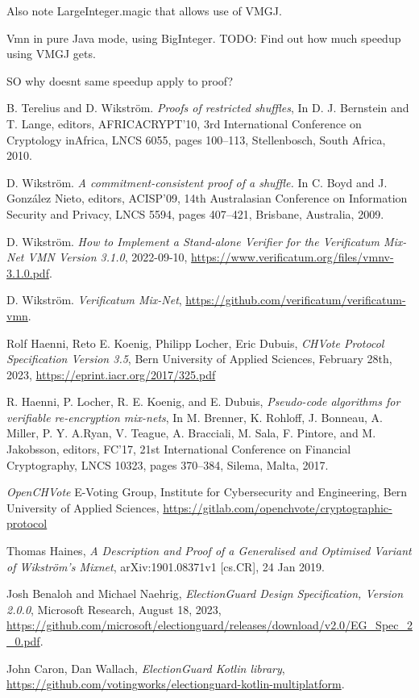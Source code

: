 \documentclass{article}
\begin{document}
Also note LargeInteger.magic that allows use of VMGJ.

Vmn in pure Java mode, using BigInteger. TODO: Find out how much speedup
using VMGJ gets.

SO why doesnt same speedup apply to proof?

\begin{thebibliography}{999}

  B. Terelius and D. Wikström. 
  \emph{Proofs of restricted shuffles},
  In D. J. Bernstein and T. Lange, editors, AFRICACRYPT'10, 
  3rd International Conference on Cryptology inAfrica, LNCS 6055, pages 100--113, 
  Stellenbosch, South Africa, 2010. 

 D. Wikström. 
  \emph{A commitment-consistent proof of a shuffle.} 
  In C. Boyd and J. González Nieto, editors, 
  ACISP'09, 14th Australasian Conference on Information Security and Privacy, LNCS 5594, pages 407--421,
  Brisbane, Australia, 2009. 

 D. Wikström. 
  \emph{How to Implement a Stand-alone Verifier for the Verificatum Mix-Net VMN Version 3.1.0},
  2022-09-10, 
  \url{https://www.verificatum.org/files/vmnv-3.1.0.pdf}.

 D. Wikström. 
  \emph{Verificatum Mix-Net},
  \url{https://github.com/verificatum/verificatum-vmn}.

  Rolf Haenni, Reto E. Koenig, Philipp Locher, Eric Dubuis,
  \emph{CHVote Protocol Specification Version 3.5}, 
  Bern University of Applied Sciences,
  February 28th, 2023, 
  \url{https://eprint.iacr.org/2017/325.pdf} 
  
  R. Haenni, P. Locher, R. E. Koenig, and E. Dubuis,
  \emph{Pseudo-code algorithms for verifiable re-encryption mix-nets},
  In M. Brenner, K. Rohloff, J. Bonneau, A. Miller, P. Y. A.Ryan, V. Teague, A. Bracciali, M. Sala, F. Pintore, and M. Jakobsson, editors, 
  FC'17, 21st International Conference on Financial Cryptography, LNCS 10323, pages 370--384,
  Silema, Malta, 2017. 
  
\emph{OpenCHVote}
  E-Voting Group, Institute for Cybersecurity and Engineering, 
  Bern University of Applied Sciences, 
  \url{https://gitlab.com/openchvote/cryptographic-protocol} 

  Thomas Haines, 
  \emph{A Description and Proof of a Generalised and Optimised Variant of Wikström's Mixnet}, arXiv:1901.08371v1 {[}cs.CR{]},
  24 Jan 2019.

  Josh Benaloh and Michael Naehrig,
  \emph{ElectionGuard Design Specification, Version 2.0.0},
  Microsoft Research, 
  August 18, 2023,
  \url{https://github.com/microsoft/electionguard/releases/download/v2.0/EG\_Spec\_2\_0.pdf}.
  
  John Caron, Dan Wallach, 
  \emph{ElectionGuard Kotlin library}, 
  \url{https://github.com/votingworks/electionguard-kotlin-multiplatform}.
  
\end{thebibliography}
\end{document}
